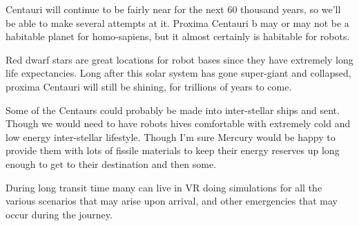 Centauri will continue to be fairly near for the next 60 thousand
years, so we'll be able to make several attempts at it.  Proxima Centauri b may
or may not be a habitable planet for homo-sapiens, but it almost certainly is
habitable for robots. 

Red dwarf stars are great locations for robot bases since they have extremely
long life expectancies. Long after this solar system has gone super-giant and
collapsed, proxima Centauri will still be shining, for trillions of
years to come. 


Some of the Centaurs could probably be made into inter-stellar ships and sent.
Though we would need to have robots hives comfortable with extremely cold and
low energy inter-stellar lifestyle. Though I'm sure Mercury would be happy to
provide them with lots of fissile materials to keep their energy reserves up
long enough to get to their destination and then some. 

During long transit time many can live in VR doing simulations for all the
various scenarios that may arise upon arrival, and other emergencies that may
occur during the journey. 

